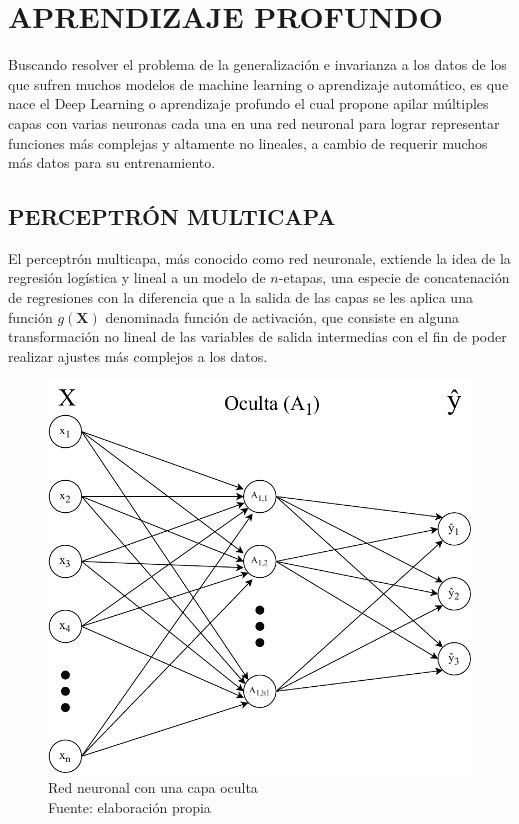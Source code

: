 \section{APRENDIZAJE PROFUNDO}
    Buscando resolver el problema de la generalización e invarianza a los datos de los que sufren muchos modelos de machine learning o aprendizaje automático, es que nace el Deep Learning o aprendizaje profundo el cual propone apilar múltiples capas con varias neuronas cada una en una red neuronal para lograr representar funciones más complejas y altamente no lineales, a cambio de requerir muchos más datos para su entrenamiento. \citep{Goodfellow-et-al-2016}
    \subsection{PERCEPTRÓN MULTICAPA}
        El perceptrón multicapa, más conocido como red neuronale, extiende la idea de la regresión logística y lineal a un modelo de $n$-etapas, una especie de concatenación de regresiones con la diferencia que a la salida de las capas se les aplica una función $g(\mathbf{X})$ denominada función de activación, que consiste en alguna transformación no lineal de las variables de salida intermedias con el fin de poder realizar ajustes más complejos a los datos. \citep{hastie01statisticallearning}
        
        \begin{figure}[h]
            \centering
            \includegraphics[scale=0.74]{imagenes/NeuralNetwork}
            \caption[Red neuronal con una capa oculta]{Red neuronal con una capa oculta\\Fuente: elaboración propia}
        \end{figure}
        
